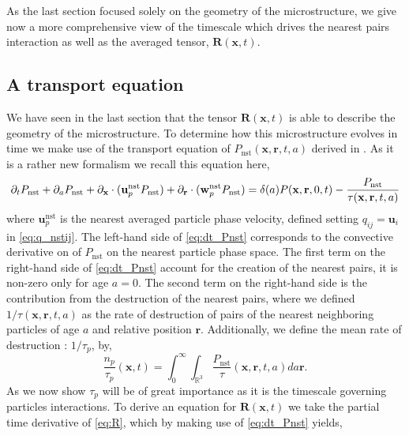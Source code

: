 
As the last section focused solely on the geometry of the microstructure, we give now a more comprehensive view of the timescale which drives the nearest pairs interaction as well as the averaged tensor, $\textbf{R}(\textbf{x},t)$. 

\subsection{A transport equation}
We have seen in the last section that the tensor $\textbf{R}(\textbf{x},t)$ is able to describe the geometry of the microstructure. 
To determine how this microstructure evolves in time we make use of the transport equation of $P_\text{nst}(\textbf{x},\textbf{r},t,a)$ derived in \citet{zhang2023evolution}.
As it is a rather new formalism we recall this equation here, 
\begin{equation}
    \partial_t P_\text{nst}
    + \partial_a P_\text{nst}
    + \partial_\textbf{x} \cdot  (\textbf{u}^\text{nst}_p P_\text{nst})
    + \partial_\textbf{r} \cdot  (\textbf{w}^\text{nst}_p P_\text{nst})
    = \delta(a)P(\textbf{x},\textbf{r},0,t)
    - \frac{P_\text{nst}}{\tau(\textbf{x},\textbf{r},t,a)}
    \label{eq:dt_Pnst}
\end{equation}
where $\textbf{u}^\text{nst}_p$ is the nearest averaged particle phase velocity, defined setting $q_{ij} = \textbf{u}_i$ in \ref{eq:q_nstij}. 
The left-hand side of \ref{eq:dt_Pnst} corresponds to the convective derivative on of $P_\text{nst}$ on the nearest particle phase space. 
The first term on the right-hand side of \ref{eq:dt_Pnst} account for the creation of the nearest pairs, it is non-zero only for age $a = 0$. 
The second term on the right-hand side is the contribution from the destruction of the nearest pairs, where we defined $1/\tau(\textbf{x},\textbf{r},t,a)$ as the rate of destruction of pairs of the nearest neighboring particles of age $a$ and relative position $\textbf{r}$.
Additionally, we define the mean rate of destruction : $1/\tau_p$, by, 
\begin{equation*}
    \frac{n_p}{\tau_p}(\textbf{x},t) = 
    \int_{0}^\infty
    \int_{\mathbb{R}^3}
    \frac{P_\text{nst} }{\tau}(\textbf{x},\textbf{r},t,a)
    da \textbf{r}. 
\end{equation*}
As we now show $\tau_p$ will be of great importance as it is the timescale governing particles interactions. 
To derive an equation for $\textbf{R}(\textbf{x},t)$ we take the partial time derivative of \ref{eq:R}, which by making use of \ref{eq:dt_Pnst} yields,
